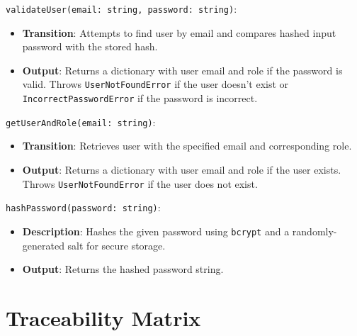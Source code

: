\documentclass[12pt, titlepage]{article}
\begin{document}
\begin{description}
\begin{description}
\begin{description}
  \item
  \texttt{validateUser(email: string, password: string)}:
  \item
  \begin{itemize}
    \item \textbf{Transition}: Attempts to find user by email and compares hashed
    input password with the stored hash.
  \end{itemize}
  \item
  \begin{itemize}
    \item \textbf{Output}: Returns a dictionary with user email and role if the password is valid. Throws \texttt{UserNotFoundError} if the user doesn't exist or \texttt{IncorrectPasswordError} if the password is incorrect.
  \end{itemize}

  \item
  \texttt{getUserAndRole(email: string)}:
  \item
  \begin{itemize}
    \item \textbf{Transition}: Retrieves user with the specified email and
    corresponding role.
  \end{itemize}
  \item
  \begin{itemize}
    \item \textbf{Output}: Returns a dictionary with user email and role if the user exists. Throws \texttt{UserNotFoundError} if the user does not exist.
  \end{itemize}

  \item[Local Function:]
  \item
  \texttt{hashPassword(password: string)}:
  \item
  \begin{itemize}
    \item \textbf{Description}: Hashes the given password using \texttt{bcrypt}
    and a randomly-generated salt for secure storage.
  \end{itemize}
  \item 
  \begin{itemize}
    \item \textbf{Output}: Returns the hashed password string.
  \end{itemize}
\end{description}

\section{Traceability Matrix} \label{SecTM}


\end{description}
\end{description}
\end{document}
